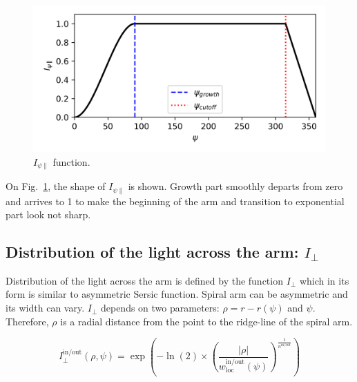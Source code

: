 \documentclass[12pt,a4paper]{article}
\begin{document}
\begin{figure}
	\centering
	\includegraphics[width=0.95\linewidth]{"pictures/I_parallel_illustration"}
	\caption{$I_{\psi \parallel}$ function.}
	\label{fig:I_parallel}
\end{figure}

On Fig.~\ref{fig:I_parallel}, the shape of $I_{\psi \parallel}$ is shown. Growth part smoothly departs from zero and arrives to 1 to make the beginning of the arm and transition to exponential part look not sharp.

\subsection{Distribution of the light across the arm: $I_\bot$}

Distribution of the light across the arm is defined by the function $I_\bot$ which in its form is similar to asymmetric Sersic function. Spiral arm can be asymmetric and its width can vary. $I_\bot$ depends on two parameters: $\rho = r - r(\psi)$ and $\psi$. Therefore, $\rho$ is a radial distance from the point to the ridge-line of the spiral arm.

\begin{equation}
	I_\bot^\text{in/out}(\rho, \psi) = \exp \left(-\ln(2) \times \left( \frac{|\rho|}{w_\text{loc}^\text{in/out}(\psi)} \right)^{\frac{1}{n^\text{in/out}}} \right)
\end{equation}
\end{document}

